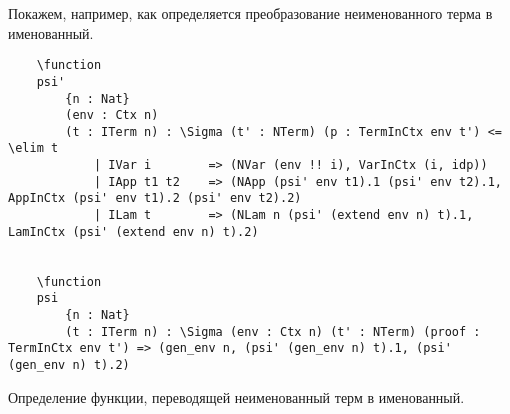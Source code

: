 %
%
%

Покажем, например, как определяется преобразование неименованного терма в именованный.

\begin{listing}[H]
  \begin{verbatim}
    \function
    psi'
        {n : Nat}
        (env : Ctx n)
        (t : ITerm n) : \Sigma (t' : NTerm) (p : TermInCtx env t') <= \elim t
            | IVar i        => (NVar (env !! i), VarInCtx (i, idp))
            | IApp t1 t2    => (NApp (psi' env t1).1 (psi' env t2).1, AppInCtx (psi' env t1).2 (psi' env t2).2)
            | ILam t        => (NLam n (psi' (extend env n) t).1, LamInCtx (psi' (extend env n) t).2)


    \function
    psi
        {n : Nat}
        (t : ITerm n) : \Sigma (env : Ctx n) (t' : NTerm) (proof : TermInCtx env t') => (gen_env n, (psi' (gen_env n) t).1, (psi' (gen_env n) t).2)
  \end{verbatim}
  \caption{Определение функции, переводящей неименованный терм в именованный.}
\end{listing}


